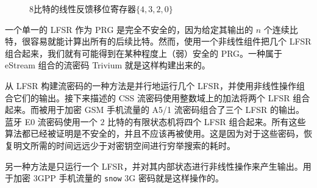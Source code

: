 \begin{figure}
	\centering
	
	\caption{$8$比特的线性反馈移位寄存器$\{4,3,2,0\}$}
	\label{fig:3-10}
\end{figure}

\begin{snote}
一个单一的 LFSR 作为 PRG 是完全不安全的，因为给定其输出的 $n$ 个连续比特，很容易就能计算出所有的后续比特。然而，使用一个非线性组件把几个 LFSR 组合起来，我们就有可能得到在某种程度上（弱）安全的 PRG。一种属于 eStream 组合的流密码 Trivium 就是这样构建出来的。

从 LFSR 构建流密码的一种方法是并行地运行几个 LFSR，并使用非线性操作组合它们的输出。接下来描述的 CSS 流密码使用整数域上的加法将两个 LFSR 组合起来。而被用于加密 GSM 手机流量的 A5/1 流密码组合了三个 LFSR 的输出。蓝牙 E0 流密码使用一个 $2$ 比特的有限状态机将四个 LFSR 组合起来。所有这些算法都已经被证明是不安全的，并且不应该再被使用。这是因为对于这些密码，恢复明文所需的时间远远少于对密钥空间进行穷举搜索的耗时。

另一种方法是只运行一个 LFSR，并对其内部状态进行非线性操作来产生输出。用于加密 3GPP 手机流量的 \texttt{snow} 3G 密码就是这样操作的。
\end{snote}

